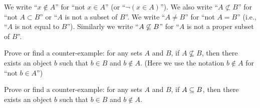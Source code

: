 \begin{notation}
We write ``$x\notin A$'' for ``not $x\in A$'' (or ``$\neg(x\in A)$'').
We also write ``$A\nsubset B$'' for ``not $A\subset B$'' or ``$A$ is not
a subset of $B$''. We write
``$A\neq B$'' for ``not $A=B$'' (i.e., ``$A$ is not equal to
$B$''). Similarly we write ``$A\not\propersubset B$'' for ``$A$ is not a
proper subset of $B$''.
\end{notation}

\begin{xca}\label{xca:subsets:proper-subsets-do-not-contain-some-object}
Prove or find a counter-example: for any sets $A$ and $B$, if
$A\nsubseteq B$, then there exists an object $b$ such that $b\in B$ and 
$b\notin A$. (Here we use the notation $b\notin A$ for ``not $b\in A$'')
\end{xca}

\begin{xca}\label{xca:subsets:proper-subsets-missing-something}
Prove or find a counter-example: for any sets $A$ and $B$, if
$A\propersubset B$, then there exists an object $b$ such that $b\in B$
and $b\notin A$. 
\end{xca}
